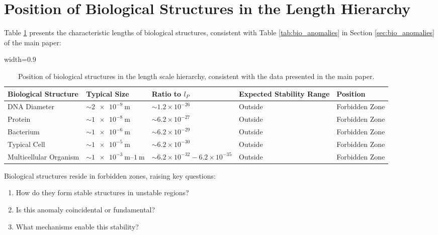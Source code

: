 \documentclass[12pt,a4paper]{article}
\newcommand{\tablescale}{0.9}
\begin{document}
	\section{Position of Biological Structures in the Length Hierarchy}
	\label{sec:bio_anomalies_detail}
	
	Table \ref{tab:bio_structures} presents the characteristic lengths of biological structures, consistent with Table \ref{tab:bio_anomalies} in Section \ref{sec:bio_anomalies} of the main paper:
	
	\begin{table}[H]
		\centering
		\begin{adjustbox}{width=\tablescale\textwidth}
			\begin{tabular}{lllll}
				\toprule
				\textbf{Biological Structure} & \textbf{Typical Size} & \textbf{Ratio to $l_P$} & \textbf{Expected Stability Range} & \textbf{Position} \\
				\midrule
				DNA Diameter & $\sim \SI{2e-9}{\meter}$ & $\sim 1.2 \times 10^{-26}$ & Outside & Forbidden Zone \\
				Protein & $\sim \SI{1e-8}{\meter}$ & $\sim 6.2 \times 10^{-27}$ & Outside & Forbidden Zone \\
				Bacterium & $\sim \SI{1e-6}{\meter}$ & $\sim 6.2 \times 10^{-29}$ & Outside & Forbidden Zone \\
				Typical Cell & $\sim \SI{1e-5}{\meter}$ & $\sim 6.2 \times 10^{-30}$ & Outside & Forbidden Zone \\
				Multicellular Organism & $\sim \SIrange{1e-3}{1}{\meter}$ & $\sim 6.2 \times 10^{-32} - 6.2 \times 10^{-35}$ & Outside & Forbidden Zone \\
				\bottomrule
			\end{tabular}
		\end{adjustbox}
		\caption{Position of biological structures in the length scale hierarchy, consistent with the data presented in the main paper.}
		\label{tab:bio_structures}
	\end{table}
	
	Biological structures reside in forbidden zones, raising key questions:
	\begin{enumerate}
		\item How do they form stable structures in unstable regions?
		\item Is this anomaly coincidental or fundamental?
		\item What mechanisms enable this stability?
	\end{enumerate}
	
\end{document}
